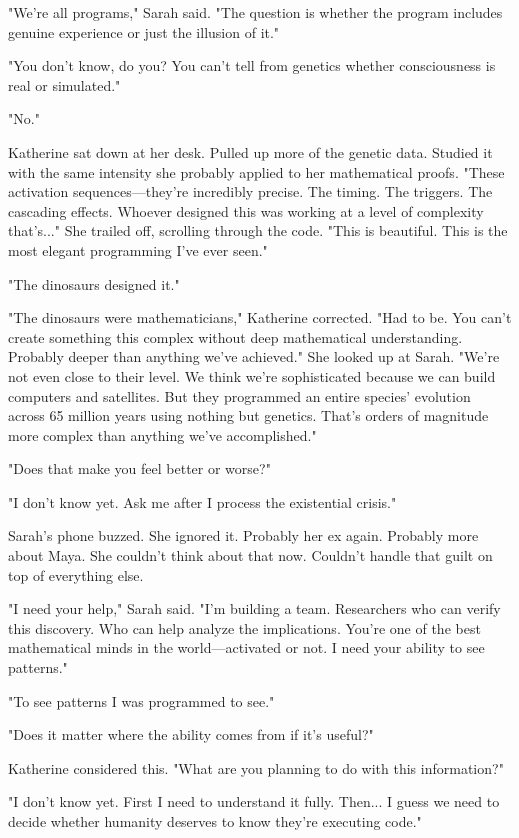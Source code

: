 "We're all programs," Sarah said. "The question is whether the program includes genuine experience or just the illusion of it."

"You don't know, do you? You can't tell from genetics whether consciousness is real or simulated."

"No."

Katherine sat down at her desk. Pulled up more of the genetic data. Studied it with the same intensity she probably applied to her mathematical proofs. "These activation sequences—they're incredibly precise. The timing. The triggers. The cascading effects. Whoever designed this was working at a level of complexity that's..." She trailed off, scrolling through the code. "This is beautiful. This is the most elegant programming I've ever seen."

"The dinosaurs designed it."

"The dinosaurs were mathematicians," Katherine corrected. "Had to be. You can't create something this complex without deep mathematical understanding. Probably deeper than anything we've achieved." She looked up at Sarah. "We're not even close to their level. We think we're sophisticated because we can build computers and satellites. But they programmed an entire species' evolution across 65 million years using nothing but genetics. That's orders of magnitude more complex than anything we've accomplished."

"Does that make you feel better or worse?"

"I don't know yet. Ask me after I process the existential crisis."

Sarah's phone buzzed. She ignored it. Probably her ex again. Probably more about Maya. She couldn't think about that now. Couldn't handle that guilt on top of everything else.

"I need your help," Sarah said. "I'm building a team. Researchers who can verify this discovery. Who can help analyze the implications. You're one of the best mathematical minds in the world—activated or not. I need your ability to see patterns."

"To see patterns I was programmed to see."

"Does it matter where the ability comes from if it's useful?"

Katherine considered this. "What are you planning to do with this information?"

"I don't know yet. First I need to understand it fully. Then... I guess we need to decide whether humanity deserves to know they're executing code."

